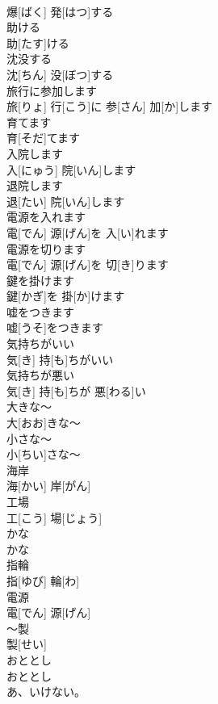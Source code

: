 \documentclass[8pt]{extreport}
\begin{document}
\begin{CJK}{UTF8}{min}
\\	爆[ばく] 発[はつ]する		
\\	助ける	
\\	助[たす]ける		
\\	沈没する	
\\	沈[ちん] 没[ぼつ]する		
\\	旅行に参加します	
\\	旅[りょ] 行[こう]に 参[さん] 加[か]します		
\\	育てます	
\\	育[そだ]てます		
\\	入院します	
\\	入[にゅう] 院[いん]します		
\\	退院します	
\\	退[たい] 院[いん]します		
\\	電源を入れます	
\\	電[でん] 源[げん]を 入[い]れます		
\\	電源を切ります	
\\	電[でん] 源[げん]を 切[き]ります		
\\	鍵を掛けます	
\\	鍵[かぎ]を 掛[か]けます		
\\	嘘をつきます	
\\	嘘[うそ]をつきます		
\\	気持ちがいい	
\\	気[き] 持[も]ちがいい		
\\	気持ちが悪い	
\\	気[き] 持[も]ちが 悪[わる]い		
\\	大きな～	
\\	大[おお]きな～		
\\	小さな～	
\\	小[ちい]さな～		
\\	海岸	
\\	海[かい] 岸[がん]		
\\	工場	
\\	工[こう] 場[じょう]		
\\	かな	
\\	かな		
\\	指輪	
\\	指[ゆび] 輪[わ]		
\\	電源	
\\	電[でん] 源[げん]		
\\	～製	
\\	製[せい]		
\\	おととし	
\\	おととし		
\\	あ、いけない。	

\end{CJK}
\end{document}
